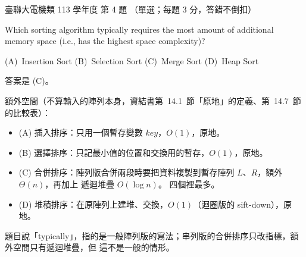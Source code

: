\begin{pastexam}[label={px:ust-113-ee-ds-04}]{臺聯大電機類 113 學年度 第 4 題}
（單選；每題 3 分，答錯不倒扣）

Which sorting algorithm typically requires the most amount of additional memory space (i.e., has
the highest space complexity)?

(A)~Insertion Sort \qquad (B)~Selection Sort \qquad (C)~Merge Sort \qquad (D)~Heap Sort
\end{pastexam}

\begin{pastsoln}
答案是 (C)。

額外空間（不算輸入的陣列本身，資結書第~14.1~節「原地」的定義、第~14.7~節的比較表）：
\begin{itemize}
\item (A) 插入排序：只用一個暫存變數 $\mathit{key}$，$O(1)$，原地。
\item (B) 選擇排序：只記最小值的位置和交換用的暫存，$O(1)$，原地。
\item (C) 合併排序：陣列版合併兩段時要把資料複製到暫存陣列 $L$、$R$，額外 $\Theta(n)$，再加上
遞迴堆疊 $O(\log n)$。 四個裡最多。
\item (D) 堆積排序：在原陣列上建堆、交換，$O(1)$（迴圈版的 sift-down），原地。
\end{itemize}
題目說「typically」，指的是一般陣列版的寫法；串列版的合併排序只改指標，額外空間只有遞迴堆疊，但
這不是一般的情形。
\end{pastsoln}
